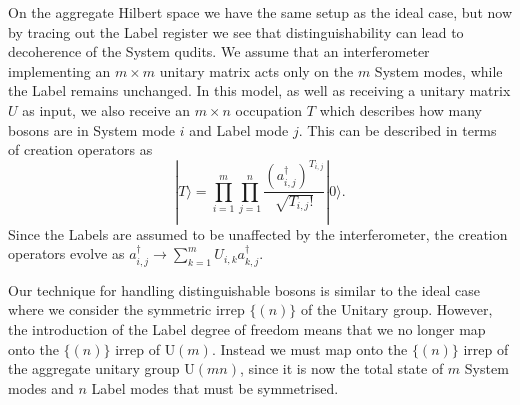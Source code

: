 On the aggregate Hilbert space we have the same setup as the ideal case, but now by tracing out the Label register we see that distinguishability can lead to decoherence of the System qudits.
We assume that an interferometer implementing an $m \times m$ unitary matrix acts only on the $m$ System modes, while the Label remains unchanged. 
In this model, as well as receiving a unitary matrix $U$ as input, we also receive an $m \times n$ occupation $T$ which describes how many bosons are in System mode $i$ and Label mode $j$. 
This can be described in terms of creation operators as
\begin{equation}
|T\rangle = \prod_{i=1}^m \prod_{j = 1}^n \frac{(a_{i,j}^\dagger)^{T_{i,j}}}{\sqrt{T_{i,j}!}}|0\rangle.
\end{equation}
Since the Labels are assumed to be unaffected by the interferometer, the creation operators evolve as $a_{i, j}^\dagger \rightarrow \sum_{k = 1}^m U_{i,k}a_{k, j}^\dagger$.

Our technique for handling distinguishable bosons is similar to the ideal case where we consider the symmetric irrep $\{(n)\}$ of the Unitary group. 
However, the introduction of the Label degree of freedom means that we no longer map onto the $\{(n)\}$ irrep of $\mathrm{U}(m)$. 
Instead we must map onto the $\{(n)\}$ irrep of the aggregate unitary group $\mathrm{U}(mn)$, since it is now the total state of $m$ System modes and $n$ Label modes that must be symmetrised.

